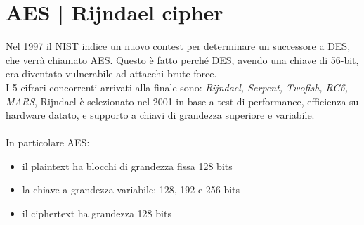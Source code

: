 \documentclass[11pt, oneside]{article}   	%
\begin{document}
 
\section*{AES | Rijndael cipher}
Nel 1997 il NIST indice un nuovo contest per determinare un successore a DES, che verrà chiamato AES. Questo è fatto perché DES, avendo una chiave di 56-bit, era diventato vulnerabile ad attacchi brute force.\\
I 5 cifrari concorrenti arrivati alla finale sono: \emph{Rijndael, Serpent, Twofish, RC6, MARS}, Rijndael è selezionato nel 2001 in base a test di performance, efficienza su hardware datato, e supporto a chiavi di grandezza superiore e variabile.\\\\
In particolare AES:
\begin{itemize}
\item il plaintext ha blocchi di grandezza fissa 128 bits
\item la chiave a grandezza variabile: 128, 192 e 256 bits
\item il ciphertext ha grandezza 128 bits
\end{itemize}
\end{document}
